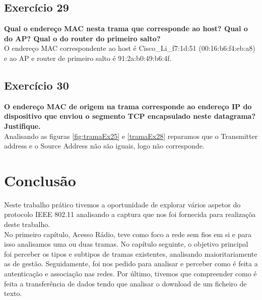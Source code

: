 \documentclass[a4paper]{report}
\begin{document}
\section{Exercício 29}
\textbf{Qual o endereço MAC nesta trama que corresponde ao host? Qual o do AP?
Qual o do router do primeiro salto?}\\
O endereço MAC correspondente ao host é Cisco\_Li\_f7:1d:51 (00:16:b6:f4:eb:a8)
e ao AP e router de primeiro salto é 91:2a:b0:49:b6:4f.

\section{Exercício 30}
\textbf{O endereço MAC de origem na trama corresponde ao endereço IP do
dispositivo que enviou o segmento TCP encapsulado neste datagrama?
Justifique.}\\
Analisando as figuras \ref{fig:tramaEx25} e \ref{tramaEx28} reparamos que o
Transmitter address e o Source Address não são iguais, logo não
corresponde.


\chapter{Conclusão}
Neste trabalho prático tivemos a oportunidade de explorar vários aspetos do
protocolo IEEE 802.11 analisando a captura que nos foi fornecida para realizaçõa
deste trabalho.\\
No primeiro capítulo, Acesso Rádio, teve como foco a rede sem fios em si e para
isso analisamos uma ou duas tramas. No capítulo seguinte, o objetivo principal
foi perceber os tipos e subtipos de tramas existentes, analisando
maioritariamente as de gestão. Seguidamente, foi nos pedido para analisar e
perceber como é feita a autenticação e associação nas redes. Por último, tivemos
que compreender como é feita a transferência de dados tendo que analisar o
download de um ficheiro de texto.
\end{document}
